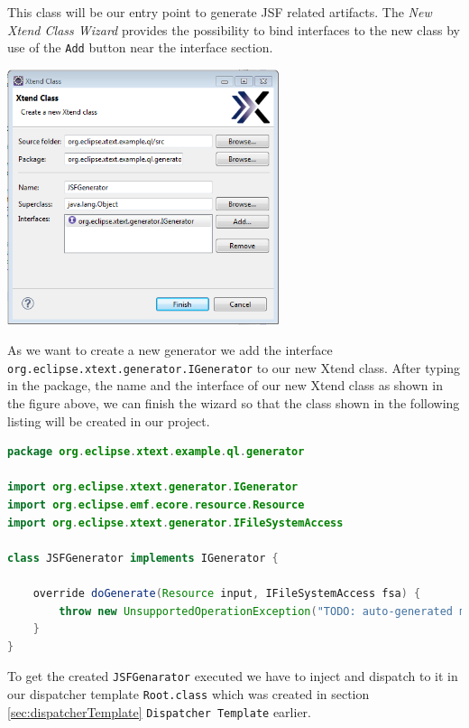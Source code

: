 This class will be our entry point to generate JSF related artifacts. The
\emph{New Xtend Class Wizard} provides the possibility to bind interfaces to the
new class by use of the \texttt{Add} button near the interface section.

\begin{center}
\includegraphics[width=8cm]{./images/chapter02/newXtendClassWizard.png}
\end{center}

As we want to create a new generator we add the interface
\texttt{org.eclipse.xtext.generator.IGenerator} to our new Xtend class.
After typing in the package, the name and the interface of our new Xtend class
as shown in the figure above, we can finish the
wizard so that the class shown in the following listing
will be created in our project.

\begin{lstlisting}[language=Java] 
package org.eclipse.xtext.example.ql.generator

import org.eclipse.xtext.generator.IGenerator
import org.eclipse.emf.ecore.resource.Resource
import org.eclipse.xtext.generator.IFileSystemAccess

class JSFGenerator implements IGenerator {
	
	override doGenerate(Resource input, IFileSystemAccess fsa) {
		throw new UnsupportedOperationException("TODO: auto-generated method stub")
	}
}
\end{lstlisting}

To get the created \texttt{JSFGenarator} executed we have to inject and dispatch
to it in our dispatcher template \texttt{Root.class}
which was created in section \ref{sec:dispatcherTemplate}
\texttt{Dispatcher Template} earlier.

